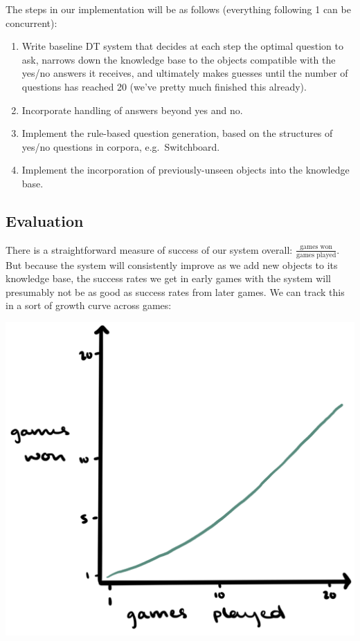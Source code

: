 \documentclass[a4paper,12pt]{article}
\begin{document}
The steps in our implementation will be as follows (everything following 1 can be concurrent):
\begin{enumerate}
	\item Write baseline DT system that decides at each step the optimal question to ask, narrows down the knowledge base to the objects compatible with the yes/no answers it receives, and ultimately makes guesses until the number of questions has reached 20 (we've pretty much finished this already).
	\item Incorporate handling of answers beyond yes and no.
	\item Implement the rule-based question generation, based on the structures of yes/no questions in corpora, e.g.\ Switchboard.
	\item Implement the incorporation of previously-unseen objects into the knowledge base.
\end{enumerate}

\subsection*{Evaluation}

There is a straightforward measure of success of our system overall: $\frac{\text{games won}}{\text{games played}}$. But because the system will consistently improve as we add new objects to its knowledge base, the success rates we get in early games with the system will presumably not be as good as success rates from later games. We can track this in a sort of growth curve across games:
	
\begin{center}
	\includegraphics[width=.5\linewidth]{growth-curve.png}
\end{center}
\end{document}
